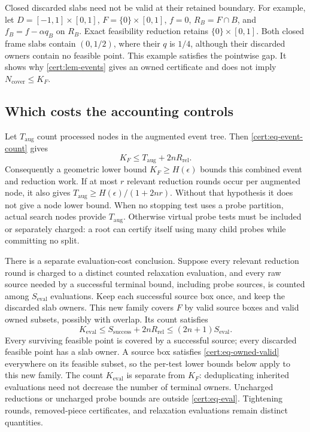 Closed discarded slabs need not be valid at their retained boundary.
For example, let $D=[-1,1]\times[0,1]$, $F=\{0\}\times[0,1]$, $f=0$,
$R_B=F\cap B$, and $f_B=f-\alpha q_B$ on $R_B$. Exact feasibility
reduction retains $\{0\}\times[0,1]$. Both closed frame slabs contain
$(0,1/2)$, where their $q$ is $1/4$, although their discarded owners
contain no feasible point. This example satisfies the pointwise gap.
It shows why \cref{cert:lem-events} gives an owned certificate and does
not imply $N_{\mathrm{cover}}\leq K_F$.

\subsection{Which costs the accounting controls}

Let $T_{\mathrm{aug}}$ count processed nodes in the augmented event tree.
Then \cref{cert:eq-event-count} gives
\begin{equation}\label{cert:eq-work}
 K_F\leq T_{\mathrm{aug}}+2nR_{\mathrm{rel}}.
\end{equation}
Consequently a geometric lower bound $K_F\geq H(\epsilon)$ bounds this
combined event and reduction work. If at most $r$ relevant reduction
rounds occur per augmented node, it also gives
$T_{\mathrm{aug}}\geq H(\epsilon)/(1+2nr)$. Without that hypothesis it
does not give a node lower bound. When no stopping test uses a probe
partition, actual search nodes provide $T_{\mathrm{aug}}$. Otherwise
virtual probe tests must be included or separately charged: a root can
certify itself using many child probes while committing no split.

There is a separate evaluation-cost conclusion. Suppose every relevant
reduction round is charged to a distinct counted relaxation evaluation,
and every raw source needed by a successful terminal bound, including
probe sources, is counted among $S_{\mathrm{eval}}$ evaluations. Keep
each successful source box once, and keep the discarded slab owners.
This new family covers $F$ by valid source boxes and valid owned subsets,
possibly with overlap. Its count satisfies
\begin{equation}\label{cert:eq-eval}
 K_{\mathrm{eval}}\leq S_{\mathrm{success}}+2nR_{\mathrm{rel}}
                         \leq(2n+1)S_{\mathrm{eval}}.
\end{equation}
Every surviving feasible point is covered by a successful source; every
discarded feasible point has a slab owner. A source box satisfies
\cref{cert:eq-owned-valid} everywhere on its feasible subset, so the
per-test lower bounds below apply to this new family. The count
$K_{\mathrm{eval}}$ is separate from $K_F$: deduplicating inherited
evaluations need not decrease the number of terminal owners. Uncharged
reductions or uncharged probe bounds are outside
\cref{cert:eq-eval}. Tightening rounds, removed-piece certificates, and
relaxation evaluations remain distinct quantities.
